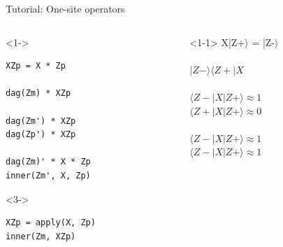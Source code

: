 \begin{frame}[fragile]{Tutorial: One-site operators}

\begin{columns}

\begin{column}{4.5cm}

\begin{onlyenv}<1->
\begin{lstlisting}[language=JuliaLocal, style=julia, basicstyle=\small]
XZp = X * Zp

dag(Zm) * XZp

dag(Zm') * XZp
dag(Zp') * XZp

dag(Zm)' * X * Zp
inner(Zm', X, Zp)
\end{lstlisting}
\end{onlyenv}

\begin{onlyenv}<3->
\begin{lstlisting}[language=JuliaLocal, style=julia, basicstyle=\small]
XZp = apply(X, Zp)
inner(Zm, XZp)
\end{lstlisting}
\end{onlyenv}

\end{column}

\begin{column}{4.5cm}

\begin{onlyenv}<1-1>
\vspace*{-0.2cm}
X|Z+$\rangle$ = |Z-$\rangle$ \\
~\\
$|Z-\rangle\langle Z+|X$ \\
~\\
$\langle Z-|X|Z+\rangle \approx 1$ \\
$\langle Z+|X|Z+\rangle \approx 0$ \\
~\\
$\langle Z-|X|Z+\rangle \approx 1$ \\
$\langle Z-|X|Z+\rangle \approx 1$
\end{onlyenv}


\end{column}
\end{columns}
\end{frame}
